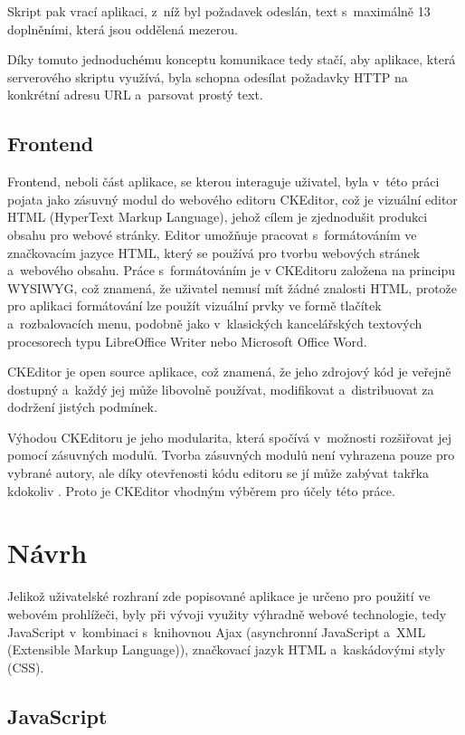 \documentclass[a4paper,11pt,openany]{book} %
\begin{document}
Skript pak vrací aplikaci, z~níž byl požadavek odeslán, text s~maximálně 13 doplněními, která jsou oddělená mezerou.

Díky tomuto jednoduchému konceptu komunikace tedy stačí, aby aplikace, která serverového skriptu využívá, byla schopna odesílat požadavky HTTP na konkrétní adresu URL a~parsovat prostý text. 

\section{Frontend}

Frontend, neboli část aplikace, se kterou interaguje uživatel, byla v~této práci pojata jako zásuvný modul do webového editoru CKEditor, což je vizuální editor HTML (HyperText Markup Language), jehož cílem je zjednodušit produkci obsahu pro webové stránky. Editor umožňuje pracovat s~formátováním ve značkovacím jazyce HTML, který se používá pro tvorbu webových stránek a~webového obsahu. Práce s~formátováním je v CKEditoru založena na principu WYSIWYG, což znamená, že uživatel nemusí mít žádné znalosti HTML, protože pro aplikaci formátování lze použít vizuální prvky ve formě tlačítek a~rozbalovacích menu, podobně jako v~klasických kancelářských textových procesorech typu LibreOffice Writer nebo Microsoft Office Word.

CKEditor je open source aplikace, což znamená, že jeho zdrojový kód je veřejně dostupný a~každý jej může libovolně používat, modifikovat a~distribuovat za dodržení jistých podmínek. 

Výhodou CKEditoru je jeho modularita, která spočívá v~možnosti rozšiřovat jej pomocí zásuvných modulů. Tvorba zásuvných modulů není vyhrazena pouze pro vybrané autory, ale  díky otevřenosti kódu editoru se jí může zabývat takřka kdokoliv \parencite{cksource2015}. Proto je CKEditor vhodným výběrem pro účely této práce. %

\chapter{Návrh}\label{navrh}

Jelikož uživatelské rozhraní zde popisované aplikace je určeno pro použití ve webovém prohlížeči, byly při vývoji využity výhradně webové technologie, tedy JavaScript v~kombinaci s~knihovnou Ajax (asynchronní JavaScript a~XML (Extensible Markup Language)), značkovací jazyk HTML a~kaskádovými styly (CSS). 

\section{JavaScript}
\end{document}
